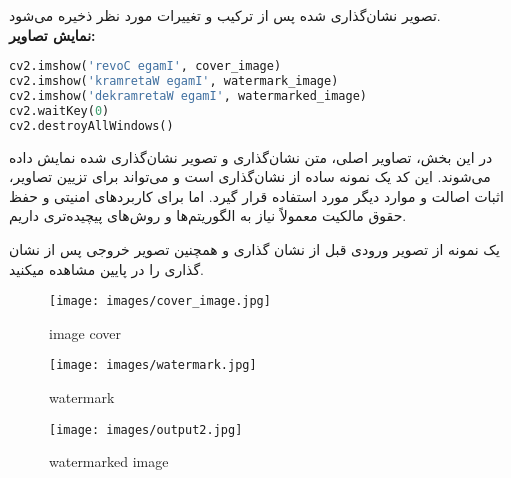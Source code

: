 تصویر نشان‌گذاری شده پس از ترکیب و تغییرات مورد نظر ذخیره می‌شود.
\\
\textbf{نمایش تصاویر:}
\begin{lstlisting}[language=Python, caption={Python code}]
cv2.imshow('revoC egamI', cover_image)
cv2.imshow('kramretaW egamI', watermark_image)
cv2.imshow('dekramretaW egamI', watermarked_image)
cv2.waitKey(0)
cv2.destroyAllWindows()
\end{lstlisting}
در این بخش، تصاویر اصلی، متن نشان‌گذاری و تصویر نشان‌گذاری شده نمایش داده می‌شوند.
این کد یک نمونه ساده از نشان‌گذاری است و می‌تواند برای تزیین تصاویر، اثبات اصالت و موارد دیگر مورد استفاده قرار گیرد. اما برای کاربردهای امنیتی و حفظ حقوق مالکیت معمولاً نیاز به الگوریتم‌ها و روش‌های پیچیده‌تری داریم.

یک نمونه از تصویر ورودی قبل از نشان گذاری و همچنین تصویر خروجی پس از نشان گذاری را در پایین مشاهده میکنید.

\begin{figure}[h!]
    \centering
    \begin{minipage}{0.3\textwidth}
        \centering
        \texttt{[image: images/cover\_image.jpg]}
        \caption{image cover}
        \label{fig:input}
    \end{minipage}
    \hfill
    \begin{minipage}{0.3\textwidth}
        \centering
        \texttt{[image: images/watermark.jpg]}
        \caption{watermark}
        \label{fig:output}
    \end{minipage}
    \hfill
    \begin{minipage}{0.3\textwidth}
        \centering
        \texttt{[image: images/output2.jpg]}
        \caption{watermarked image}
        \label{fig:output}
    \end{minipage}
\end{figure}\\